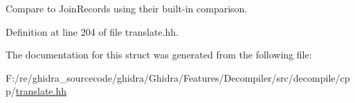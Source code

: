 Compare to Join\+Records using their built-\/in comparison. 



Definition at line 204 of file translate.\+hh.



The documentation for this struct was generated from the following file\+:\begin{DoxyCompactItemize}
\item 
F\+:/re/ghidra\+\_\+sourcecode/ghidra/\+Ghidra/\+Features/\+Decompiler/src/decompile/cpp/\mbox{\hyperlink{translate_8hh}{translate.\+hh}}\end{DoxyCompactItemize}
